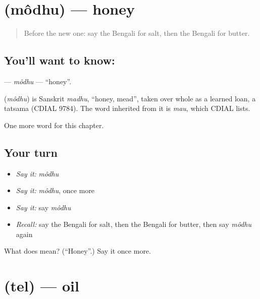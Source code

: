 \section[\texorpdfstring{\bn{মধু} (môdhu)}{মধু (môdhu)}]{ (môdhu) — honey}

\label{lesson:BN-C57-modhu}



\begin{quote}
Before the new one: say the Bengali for salt, then the Bengali for butter.
\end{quote}

\subsection*{You'll want to know: }
\textbf{} — \emph{môdhu} — \textquotedblleft{}honey\textquotedblright{}.

\begin{cousinweb}
\textbf{} (\emph{môdhu}) is Sanskrit \emph{madhu}, \textquotedblleft{}honey, mead\textquotedblright{}, taken over whole as a learned loan, a tatsama (CDIAL 9784). The word inherited from it is \emph{mau}, which CDIAL lists.
\end{cousinweb}

\begin{grammarlens}[title={What you've built}]
One more word for this chapter.
\end{grammarlens}

\subsection*{Your turn}
\begin{itemize}
\raggedright
  \item \emph{Say it:} \emph{môdhu}
  \item \emph{Say it:} \emph{môdhu}, once more
  \item \emph{Say it:} say \emph{môdhu}
  \item \emph{Recall:} say the Bengali for salt, then the Bengali for butter, then say \emph{môdhu} again
\end{itemize}

\begin{tcolorbox}[breakable,colback=teal!4,colframe=teal!35!black,title={Before you move on}]
What does  mean? (\textquotedblleft{}Honey\textquotedblright{}.) Say it once more.
\end{tcolorbox}
\section[\texorpdfstring{\bn{তেল} (tel)}{তেল (tel)}]{ (tel) — oil}

